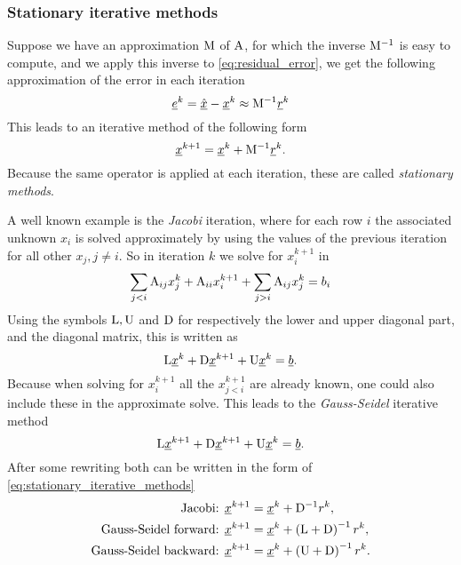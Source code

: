 \subsubsection{Stationary iterative methods} \label{sec:stationary_iterative_methods}
Suppose we have an approximation $\mathrm{M}$ of $\mathrm{A}$, for which
the inverse $\mathrm{M}^{-1}$ is easy to compute, and we apply this inverse
to \eqref{eq:residual_error}, we get the following approximation of the
error in each iteration
\begin{equation}
  \underline{e}^k=\underline{\hat x}-\underline{x}^k \approx \mathrm{M}^{-1}\underline{r}^k
    \label{eq:iterative_solver_error_estimate}
\end{equation}
This leads to an iterative method of the following form
\begin{equation}\label{eq:stationary_iterative_methods}
  \underline{x}^{k+1}=\underline{x}^{k} + \mathrm{M}^{-1} \underline{r}^{k}.
\end{equation}
Because the same operator is applied at each iteration, these are
called \emph{stationary methods}.

A well known example is the
\emph{Jacobi} iteration, where for each row $i$ the associated unknown $x_i$
is solved approximately by using the values of the previous iteration
for all other $x_j, j\neq i$. So in iteration $k$ we solve for $x^{k+1}_i$ in
\begin{equation*}
  \sum_{j<i} \mathrm{A}_{ij} x^k_j + \mathrm{A}_{ii} x^{k+1}_i +
  \sum_{j>i} \mathrm{A}_{ij} x^k_j = b_i
\end{equation*}
Using the symbols $\mathrm{L}, \mathrm{U}$ and $\mathrm{D}$ for respectively
the lower and upper diagonal part, and the diagonal matrix,
this is written as
\begin{equation*}
  \mathrm{L} \underline{x}^k +
  \mathrm{D} \underline{x}^{k+1} +
  \mathrm{U} \underline{x}^k = \underline{b}.
\end{equation*}
Because when solving for $x^{k+1}_i$ all the $x^{k+1}_{j<i}$ are already
known, one could also include these in the approximate solve. This leads
to the \emph{Gauss-Seidel} iterative method
\begin{equation*}
  \mathrm{L} \underline{x}^{k+1} +
  \mathrm{D} \underline{x}^{k+1} +
  \mathrm{U} \underline{x}^k = \underline{b}.
\end{equation*}
After some rewriting both can be written in the form of
\eqref{eq:stationary_iterative_methods}
\begin{equation}
\begin{split}
  \text{Jacobi:   } & \underline{x}^{k+1}=\underline{x}^k + \mathrm{D}^{-1} r^k, \\
  \text{Gauss-Seidel forward:  } & \underline{x}^{k+1}=\underline{x}^k + \left(\mathrm{L}+\mathrm{D}\right)^{-1} r^k, \\
  \text{Gauss-Seidel backward: } & \underline{x}^{k+1}=\underline{x}^k + \left(\mathrm{U}+\mathrm{D}\right)^{-1} r^k.
\end{split}
\end{equation}

